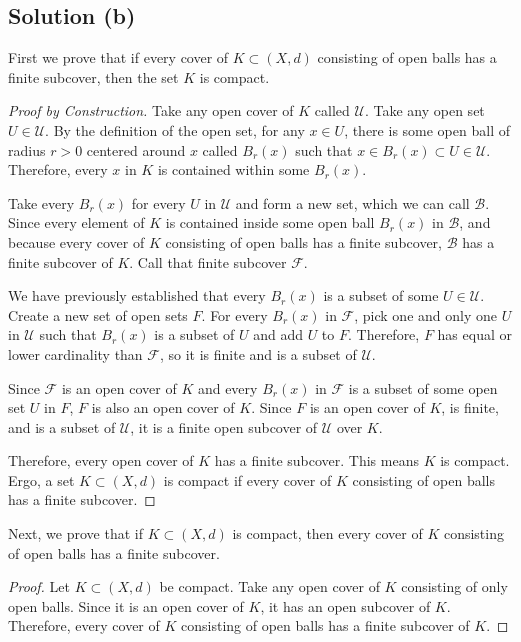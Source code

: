\documentclass[11pt]{article}
\begin{document}
    \subsection{Solution (b)}
        First we prove that if every cover of $K \subset (X,d)$ consisting of open balls has a finite subcover, then the set $K$ is compact.
        \begin{proof}[Proof by Construction]
            Take any open cover of $K$ called $\mathcal{U}$.
            Take any open set $U \in \mathcal{U}$.
            By the definition of the open set, for any $x \in U$, there is some open ball of radius $r > 0$ centered around $x$ called $B_r(x)$ such that $x \in B_r(x) \subset U \in \mathcal{U}$. 
            Therefore, every $x$ in $K$ is contained within some $B_r(x)$.
            
            Take every $B_r(x)$ for every $U$ in $\mathcal{U}$ and form a new set, which we can call $\mathcal{B}$.
            Since every element of $K$ is contained inside some open ball $B_r(x)$ in $\mathcal{B}$, and because every cover of $K$ consisting of open balls has a finite subcover, $\mathcal{B}$ has a finite subcover of $K$.
            Call that finite subcover $\mathcal{F}$.

            We have previously established that every $B_r(x)$ is a subset of some $U \in \mathcal{U}$.
            Create a new set of open sets $F$.
            For every $B_r(x)$ in $\mathcal{F}$, pick one and only one $U$ in $\mathcal{U}$ such that $B_r(x)$ is a subset of $U$ and add $U$ to $F$.
            Therefore, $F$ has equal or lower cardinality than $\mathcal{F}$, so it is finite and is a subset of $\mathcal{U}$.

            Since $\mathcal{F}$ is an open cover of $K$ and every $B_r(x)$ in $\mathcal{F}$ is a subset of some open set $U$ in $F$, $F$ is also an open cover of $K$.
            Since $F$ is an open cover of $K$, is finite, and is a subset of $\mathcal{U}$, it is a finite open subcover of $\mathcal{U}$ over $K$.
            
            Therefore, every open cover of $K$ has a finite subcover.
            This means $K$ is compact.
            Ergo, a set $K \subset (X, d)$ is compact if every cover of $K$ consisting of open balls has a finite subcover.
        \end{proof}

        Next, we prove that if $K \subset (X,d)$ is compact, then every cover of $K$ consisting of open balls has a finite subcover.
        \begin{proof}
            Let $K \subset (X,d)$ be compact.
            Take any open cover of $K$ consisting of only open balls.
            Since it is an open cover of $K$, it has an open subcover of $K$.
            Therefore, every cover of $K$ consisting of open balls has a finite subcover of $K$.
        \end{proof}
\end{document}
